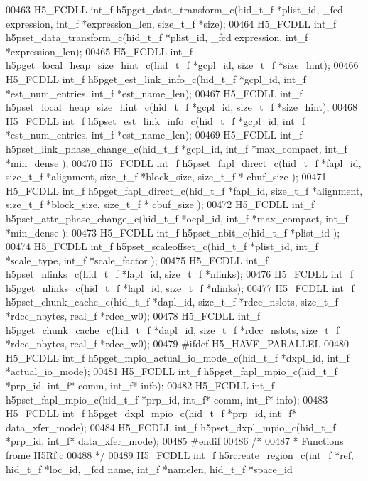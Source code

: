 \begin{DoxyCode}
00463 H5\_FCDLL int\_f h5pget\_data\_transform\_c(hid\_t\_f *plist\_id, \_fcd expression, int\_f *expression\_len, size\_t\_f 
      *size);
00464 H5\_FCDLL int\_f h5pset\_data\_transform\_c(hid\_t\_f *plist\_id, \_fcd expression, int\_f *expression\_len);
00465 H5\_FCDLL int\_f h5pget\_local\_heap\_size\_hint\_c(hid\_t\_f *gcpl\_id, size\_t\_f *size\_hint);
00466 H5\_FCDLL int\_f h5pget\_est\_link\_info\_c(hid\_t\_f *gcpl\_id, int\_f *est\_num\_entries, int\_f *est\_name\_len);
00467 H5\_FCDLL int\_f h5pset\_local\_heap\_size\_hint\_c(hid\_t\_f *gcpl\_id, size\_t\_f *size\_hint);
00468 H5\_FCDLL int\_f h5pset\_est\_link\_info\_c(hid\_t\_f *gcpl\_id, int\_f *est\_num\_entries, int\_f *est\_name\_len);
00469 H5\_FCDLL int\_f h5pset\_link\_phase\_change\_c(hid\_t\_f *gcpl\_id, int\_f *max\_compact, int\_f *min\_dense );
00470 H5\_FCDLL int\_f h5pset\_fapl\_direct\_c(hid\_t\_f *fapl\_id, size\_t\_f *alignment, size\_t\_f *block\_size, size\_t\_f *
      cbuf\_size );
00471 H5\_FCDLL int\_f h5pget\_fapl\_direct\_c(hid\_t\_f *fapl\_id, size\_t\_f *alignment, size\_t\_f *block\_size, size\_t\_f *
      cbuf\_size );
00472 H5\_FCDLL int\_f h5pset\_attr\_phase\_change\_c(hid\_t\_f *ocpl\_id, int\_f *max\_compact, int\_f *min\_dense );
00473 H5\_FCDLL int\_f h5pset\_nbit\_c(hid\_t\_f *plist\_id );
00474 H5\_FCDLL int\_f h5pset\_scaleoffset\_c(hid\_t\_f *plist\_id, int\_f *scale\_type, int\_f *scale\_factor );
00475 H5\_FCDLL int\_f h5pset\_nlinks\_c(hid\_t\_f *lapl\_id, size\_t\_f *nlinks);
00476 H5\_FCDLL int\_f h5pget\_nlinks\_c(hid\_t\_f *lapl\_id, size\_t\_f *nlinks);
00477 H5\_FCDLL int\_f h5pset\_chunk\_cache\_c(hid\_t\_f *dapl\_id, size\_t\_f *rdcc\_nslots, size\_t\_f *rdcc\_nbytes, real\_f 
      *rdcc\_w0);
00478 H5\_FCDLL int\_f h5pget\_chunk\_cache\_c(hid\_t\_f *dapl\_id, size\_t\_f *rdcc\_nslots, size\_t\_f *rdcc\_nbytes, real\_f 
      *rdcc\_w0);
00479 \textcolor{preprocessor}{#ifdef H5\_HAVE\_PARALLEL}
00480 H5\_FCDLL int\_f h5pget\_mpio\_actual\_io\_mode\_c(hid\_t\_f *dxpl\_id, int\_f *actual\_io\_mode);
00481 H5\_FCDLL int\_f h5pget\_fapl\_mpio\_c(hid\_t\_f *prp\_id, int\_f* comm, int\_f* info);
00482 H5\_FCDLL int\_f h5pset\_fapl\_mpio\_c(hid\_t\_f *prp\_id, int\_f* comm, int\_f* info);
00483 H5\_FCDLL int\_f h5pget\_dxpl\_mpio\_c(hid\_t\_f *prp\_id, int\_f* data\_xfer\_mode);
00484 H5\_FCDLL int\_f h5pset\_dxpl\_mpio\_c(hid\_t\_f *prp\_id, int\_f* data\_xfer\_mode);
00485 \textcolor{preprocessor}{#endif}
00486 \textcolor{comment}{/*}
00487 \textcolor{comment}{ * Functions frome H5Rf.c}
00488 \textcolor{comment}{ */}
00489 H5\_FCDLL int\_f h5rcreate\_region\_c(int\_f *ref, hid\_t\_f *loc\_id, \_fcd name, int\_f *namelen, hid\_t\_f *space\_id

\end{DoxyCode}
